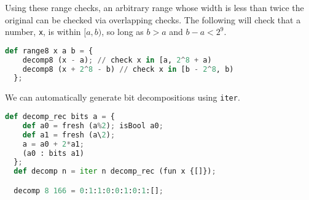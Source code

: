 Using these range checks, an arbitrary range whose width is less than twice the original can be checked via overlapping checks. The following will check that a number, \lstinline{x}, is within $[a, b)$, so long as $b > a$ and $b - a < 2^9$.

\begin{lstlisting}[language=Python]
  def range8 x a b = {
    decomp8 (x - a); // check x in [a, 2^8 + a)
    decomp8 (x + 2^8 - b) // check x in [b - 2^8, b)
  };
\end{lstlisting}

We can automatically generate bit decompositions using \lstinline{iter}.

\begin{lstlisting}[language=Python]
  def decomp_rec bits a = {
    def a0 = fresh (a%2); isBool a0;
    def a1 = fresh (a\2);
    a = a0 + 2*a1;
    (a0 : bits a1)
  };
  def decomp n = iter n decomp_rec (fun x {[]});

  decomp 8 166 = 0:1:1:0:0:1:0:1:[];
\end{lstlisting}
